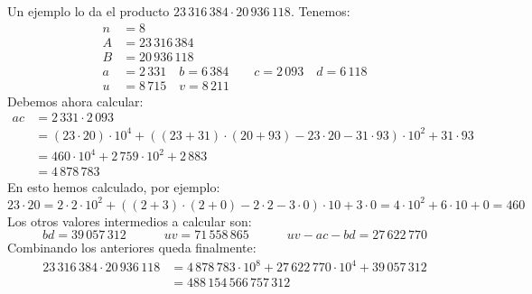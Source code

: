   Un ejemplo lo da el producto \(23\,316\,384 \cdot 20\,936\,118\).
  Tenemos:
  \begin{align*}
    n &= 8 \\
    A &= 23\,316\,384  \\
    B &= 20\,936\,118 \\
    a &= 2\,331 \quad b = 6\,384
	 \qquad c = 2\,093 \quad d = 6\,118 \\
    u &= 8\,715 \quad v = 8\,211
  \end{align*}
  Debemos ahora calcular:
  \begin{align*}
    a c
      &= 2\,331 \cdot 2\,093 \\
      &= (23 \cdot 20) \cdot 10^4
	   + ((23 + 31) \cdot (20 + 93)
	   - 23 \cdot 20
	   - 31 \cdot 93) \cdot 10^2
	   + 31 \cdot 93 \\
      &= 460 \cdot 10^4 + 2\,759 \cdot 10^2 + 2\,883 \\
      &= 4\,878\,783
  \end{align*}
  En esto hemos calculado,
  por ejemplo:
  \begin{equation*}
    23 \cdot 20
      = 2 \cdot 2 \cdot 10^2
	  + ((2 + 3) \cdot (2 + 0)
	  - 2 \cdot 2
	  - 3 \cdot 0) \cdot 10
	  + 3 \cdot 0
      = 4 \cdot 10^2 + 6 \cdot 10 + 0
      = 460
  \end{equation*}
  Los otros valores intermedios a calcular son:
  \begin{equation*}
    b d
      = 39\,057\,312
    \hspace{3em}
    u v
      = 71\,558\,865
    \hspace{3em}
    u v - a c - b d
      = 27\,622\,770
  \end{equation*}
  Combinando los anteriores queda finalmente:
  \begin{align*}
     23\,316\,384 \cdot 20\,936\,118
       &= 4\,878\,783 \cdot 10^8
	    + 27\,622\,770 \cdot 10^4
	    + 39\,057\,312 \\
       &= 488\,154\,566\,757\,312
  \end{align*}

